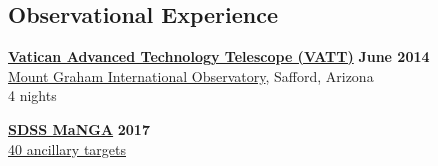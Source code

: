 \documentclass[margin]{res}
\begin{document}
\begin{resume}







\section{Observational Experience}
{\href{http://vaticanobservatory.org/VATT/}{\bf  Vatican Advanced Technology Telescope (VATT)}} \hfill \textbf{June 2014} \\
\href{http://mgio.arizona.edu}{Mount Graham International Observatory}, Safford, Arizona \\
4 nights

{\href{http://www.sdss.org/surveys/manga/}{\bf SDSS MaNGA}} \hfill \textbf{2017} \\
\href{http://www.sdss.org/dr14/manga/manga-target-selection/ancillary-targets/}{40 ancillary targets}










\end{resume}
\end{document}
